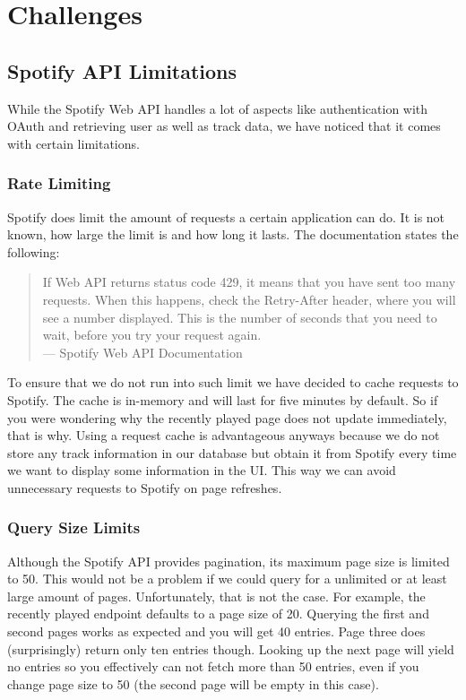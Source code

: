 \chapter{Challenges}
\label{ch:Challenges}

\section{Spotify API Limitations}

While the Spotify Web API handles a lot of aspects like authentication with OAuth and retrieving user as well as track data, we have noticed that it comes with certain limitations.

\subsection{Rate Limiting}

Spotify does limit the amount of requests a certain application can do. It is not known, how large the limit is and how long it lasts. The documentation states the following:

\begin{quote}
    If Web API returns status code 429, it means that you have sent too many requests. When this happens, check the Retry-After header, where you will see a number displayed. This is the number of seconds that you need to wait, before you try your request again. \\
    --- Spotify Web API Documentation \cite{SpotifyWebApi}
\end{quote}

To ensure that we do not run into such limit we have decided to cache requests to Spotify. The cache is in-memory and will last for five minutes by default. So if you were wondering why the recently played page does not update immediately, that is why. Using a request cache is advantageous anyways because we do not store any track information in our database but obtain it from Spotify every time we want to display some information in the UI. This way we can avoid unnecessary requests to Spotify on page refreshes.

\subsection{Query Size Limits}

Although the Spotify API provides pagination, its maximum page size is limited to 50. This would not be a problem if we could query for a unlimited or at least large amount of pages. Unfortunately, that is not the case. For example, the recently played endpoint defaults to a page size of 20. Querying the first and second pages works as expected and you will get 40 entries. Page three does (surprisingly) return only ten entries though. Looking up the next page will yield no entries so you effectively can not fetch more than 50 entries, even if you change page size to 50 (the second page will be empty in this case).

